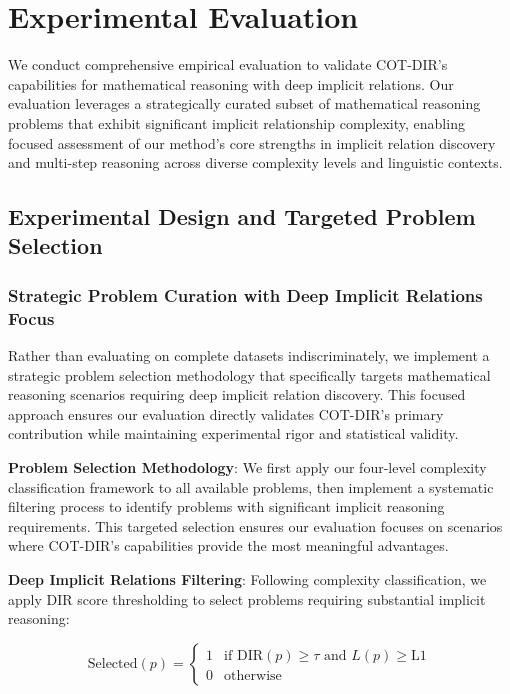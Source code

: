 \section{Experimental Evaluation}
\label{sec:experiments}

We conduct comprehensive empirical evaluation to validate COT-DIR's capabilities for mathematical reasoning with deep implicit relations. Our evaluation leverages a strategically curated subset of mathematical reasoning problems that exhibit significant implicit relationship complexity, enabling focused assessment of our method's core strengths in implicit relation discovery and multi-step reasoning across diverse complexity levels and linguistic contexts.

\subsection{Experimental Design and Targeted Problem Selection}

\subsubsection{Strategic Problem Curation with Deep Implicit Relations Focus}

Rather than evaluating on complete datasets indiscriminately, we implement a strategic problem selection methodology that specifically targets mathematical reasoning scenarios requiring deep implicit relation discovery. This focused approach ensures our evaluation directly validates COT-DIR's primary contribution while maintaining experimental rigor and statistical validity.

\textbf{Problem Selection Methodology}: We first apply our four-level complexity classification framework to all available problems, then implement a systematic filtering process to identify problems with significant implicit reasoning requirements. This targeted selection ensures our evaluation focuses on scenarios where COT-DIR's capabilities provide the most meaningful advantages.

\textbf{Deep Implicit Relations Filtering}: Following complexity classification, we apply DIR score thresholding to select problems requiring substantial implicit reasoning:

\begin{equation}
\text{Selected}(p) = \begin{cases}
1 & \text{if DIR}(p) \geq \tau \text{ and } L(p) \geq \text{L1} \\
0 & \text{otherwise}
\end{cases}
\end{equation}

